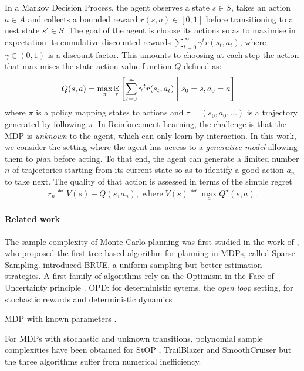 \documentclass[runningheads]{llncs}
\begin{document}
In a Markov Decision Process, the agent observes a state $s\in S$, takes an action $a\in A$ and collects a bounded reward $r(s, a)\in[0, 1]$ before transitioning to a nest state $s'\in S$. The goal of the agent is choose its actions so as to maximise in expectation its cumulative discounted rewards $\sum_{t=0}^\infty \gamma^t r(s_t, a_t)$, where $\gamma\in(0, 1)$ is a discount factor. This amounts to choosing at each step the action that maximises the state-action value function $Q$ defined as:
\begin{align*}
Q(s, a) &= \max_\pi  \operatorname*{\mathbb{E}}_\tau \left[\sum_{t=0}^\infty \gamma^t r(s_t, a_t)\;\middle|\; s_0 = s, a_0 = a\right]
\end{align*}
where $\pi$ is a policy mapping states to actions and $\tau = (s_0, a_0, \dots)$ is a trajectory generated by following $\pi$. In Reinforcement Learning, the challenge is that the MDP is \emph{unknown} to the agent, which can only learn by interaction. In this work, we consider the setting where the agent has access to a \emph{generative model} allowing them to \emph{plan} before acting. To that end, the agent can generate a limited number $n$ of trajectories starting from its current state so as to identify a good action $a_n$ to take next.
The quality of that action is assessed in terms of the simple regret
\begin{align*}
	r_n \eqdef V(s) - Q(s, {a}_n), \; \mbox{where} \; V(s) \eqdef  \max_a Q^\star(s, a).
\end{align*}

\paragraph{Related work} The sample complexity of Monte-Carlo planning was first studied in the work of \cite{Kearns02SS}, who proposed the first tree-based algorithm for planning in MDPs, called Sparse Sampling.
\cite{Feldman14BRUE} introduced BRUE, a uniform sampling but better estimation strategies.
A first family of algorithms rely on the Optimism in the Face of Uncertainty principle \citep[surveyed by][]{SurveyRemiMCTS}.
OPD: \citep{hren2008optimistic} for deterministic sytems, 
the \emph{open loop} setting, for stochastic rewards and deterministic dynamics \citep{bubeck2010open,leurent2019practical}

MDP with known parameters \citep{busoniu2012optimistic}.

For MDPs with stochastic and unknown transitions, polynomial sample complexities have been obtained for StOP \citep{STOP14}, TrailBlazer \citep{TrailBlazer16} and SmoothCruiser \citep{SmoothCruiser19} but the three algorithms suffer from numerical inefficiency.
\end{document}
